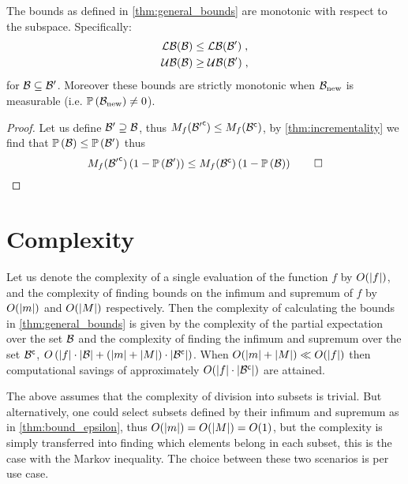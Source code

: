 \begin{corollary}[Monotonicity]
	\label{thm:monotonicity}
	The bounds as defined in \cref{thm:general_bounds} are monotonic with respect to the subspace. Specifically:
	\begin{subequations}
		\begin{align}
			\operatorname*{\mathcal{LB}}(\mathcal B) & \leq\operatorname*{\mathcal{LB}}(\mathcal B^\prime)\;, \\
			\operatorname*{\mathcal{UB}}(\mathcal B) & \geq\operatorname*{\mathcal{UB}}(\mathcal B^\prime)\;,
		\end{align}
	\end{subequations}
	for $\mathcal B\subseteq\mathcal B^\prime$. Moreover these bounds are strictly monotonic when $\mathcal B_{\textrm{\textup{new}}}$ is measurable (i.e. $\mathbb{P}\left({\mathcal B_{\textrm{\textup{new}}}}\right)\neq0$).
\end{corollary}
\begin{proof}
	Let us define $\mathcal B^\prime\supseteq\mathcal B$, thus $M_f({\mathcal B^\prime}^{\mathsf{c}})\leq M_f({\mathcal B}^{\mathsf{c}})$, by \autoref{thm:incrementality} we find that $\mathbb{P}\left({\mathcal B}\right)\leq\mathbb{P}\left({\mathcal B^\prime}\right)$ thus
	\begin{equation*}
		M_f({\mathcal B^\prime}^{\mathsf{c}})\left(1-\mathbb{P}\left({\mathcal B^\prime}\right)\right) \leq M_f({\mathcal B}^{\mathsf{c}})\left(1-\mathbb{P}\left({\mathcal B}\right)\right)\qed
	\end{equation*}
\end{proof}

\section{Complexity}\label{sec:complexity}
Let us denote the complexity of a single evaluation of the function $f$ by $O(\lvert f\rvert)$, and the complexity of finding bounds on the infimum and supremum of $f$ by $O(\lvert m\rvert)$ and $O(\lvert M\rvert)$ respectively. Then the complexity of calculating the bounds in \cref{thm:general_bounds} is given by the complexity of the partial expectation over the set $\mathcal B$ and the complexity of finding the infimum and supremum over the set ${\mathcal B}^{\mathsf{c}}$, $O\left(\lvert f\rvert\cdot\lvert\mathcal B\rvert+\left(\lvert m\rvert+\lvert M\rvert\right)\cdot\lvert{\ensuremath{\mathcal B}}^{\mathsf{c}}\rvert\right)$. When $O(\lvert m\rvert+\lvert M\rvert)\ll O(\lvert f\rvert)$ then computational savings of approximately $O(\lvert f\rvert\cdot\lvert{\ensuremath{\mathcal B}}^{\mathsf{c}}\rvert)$ are attained.

The above assumes that the complexity of division into subsets is trivial. But alternatively, one could select subsets defined by their infimum and supremum as in \autoref{thm:bound_epsilon}, thus $O(\lvert m\rvert)=O(\lvert M\rvert)=O(1)$, but the complexity is simply transferred into finding which elements belong in each subset, this is the case with the Markov inequality. The choice between these two scenarios is per use case.

